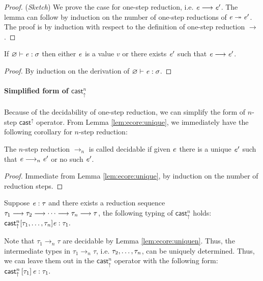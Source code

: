 \begin{proof}
    (\emph{Sketch}) We prove the case for one-step reduction, i.e. $\mathit{e}  \longrightarrow  \mathit{e'}$. The lemma can follow by induction on the number of one-step reductions
of $\mathit{e}  \twoheadrightarrow  \mathit{e'}$.
    The proof is by induction with respect to the definition of one-step
reduction $ \longrightarrow $.
\end{proof}

\begin{thm}[Progress]\label{lem:ecore:prog}
If $\varnothing  \vdash  \mathit{e}  :  \sigma$ then either $\mathit{e}$ is a value $v$ or there exists $\mathit{e}'$
such that $\mathit{e}  \longrightarrow  \mathit{e'}$.
\end{thm}

\begin{proof}
    By induction on the derivation of $\varnothing  \vdash  \mathit{e}  :  \sigma$.
\end{proof}

\paragraph{Simplified form of $ \mathsf{cast}_{\uparrow}^n $}
Because of the decidability of one-step reduction, we can simplify the form of 
$n$-step $ \mathsf{cast}^{\uparrow} $ operator. From Lemma \ref{lem:ecore:unique}, 
we immediately have the following corollary for $n$-step reduction:

\begin{lem}\label{lem:ecore:uniquen}
    The $n$-step reduction $ \longrightarrow_n $ is called decidable if 
    given $\mathit{e}$ there is a unique $\mathit{e'}$ such that $\mathit{e}  \longrightarrow_n  \mathit{e'}$ or no such $\mathit{e'}$.
\end{lem}

\begin{proof}
    Immediate from Lemma \ref{lem:ecore:unique}, by induction on the number of
reduction steps.
\end{proof}

Suppose $\mathit{e} : \tau$ and there exists a reduction sequence
$\tau_{{\mathrm{1}}}  \longrightarrow  \tau_{{\mathrm{2}}}  \longrightarrow  \dots  \longrightarrow  \tau_{\mathit{n}}  \longrightarrow  \tau$,
the following typing of $ \mathsf{cast}_{\uparrow}^n $ holds:
$
     \mathsf{cast}_{\uparrow}^n  [ \tau_{{\mathrm{1}}}, \dots, \tau_{\mathit{n}} ] \mathit{e} : \tau_{{\mathrm{1}}}.
$

Note that $\tau_{{\mathrm{1}}}  \longrightarrow_n  \tau$ are decidable by Lemma
\ref{lem:ecore:uniquen}. Thus, the intermediate types in $\tau_{{\mathrm{1}}}  \longrightarrow_n  \tau$,
i.e. $\tau_{{\mathrm{2}}}, \dots, \tau_{\mathit{n}}$, can be uniquely determined. Thus, we can leave
them out in the $ \mathsf{cast}_{\uparrow}^n $ operator with the following form:
$
    \mathsf{cast}_{\uparrow}^n \, [  \tau_{{\mathrm{1}}}  ] \,  \mathit{e} : \tau_{{\mathrm{1}}}.
$
